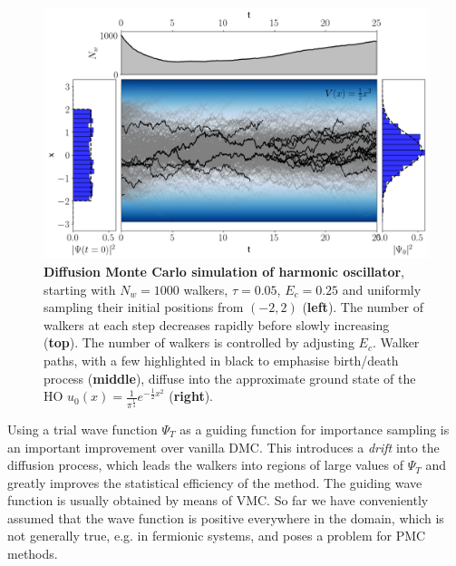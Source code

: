 \begin{figure}[H]
	\centering
	\includegraphics[width=\linewidth]{Chapter2/Figs/Raster/dmc.png}
	\caption[DMC simulation of harmonic oscillator]{\textbf{Diffusion Monte Carlo simulation of harmonic oscillator}, starting with $N_w=1000$ walkers, $\tau=0.05$, $E_c=0.25$ and uniformly sampling their initial positions from $(-2, 2)$ (\textbf{left}). The number of walkers at each step decreases rapidly before slowly increasing (\textbf{top}). The number of walkers is controlled by adjusting $E_c$. Walker paths, with a few highlighted in black to emphasise birth/death process (\textbf{middle}), diffuse into the approximate ground state of the HO $u_0(x) = \frac{1}{\pi^{\frac{1}{4}}}e^{-\frac{1}{2}x^2}$ (\textbf{right}).}
	\label{fig:dmc}
\end{figure}
Using a trial wave function $\Psi_T$ as a guiding function for importance sampling is an important improvement over vanilla DMC. This introduces a \emph{drift} into the diffusion process, which leads the walkers into regions of large values of $\Psi_T$ and greatly improves the statistical efficiency of the method. The guiding wave function is usually obtained by means of VMC. So far we have conveniently assumed that the wave function is positive everywhere in the domain, which is not generally true, e.g. in fermionic systems, and poses a problem for PMC methods.

